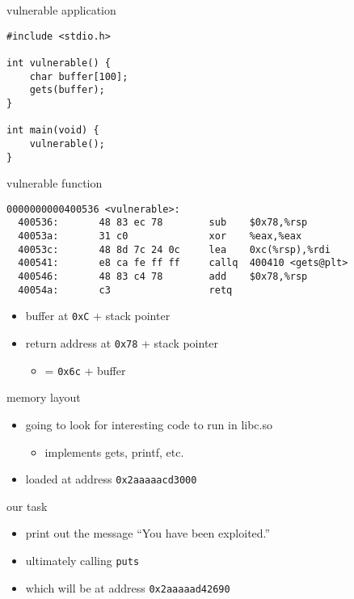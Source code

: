 \begin{frame}[fragile,label=vuln]{vulnerable application}
    \lstset{language=C,style=small}
\begin{lstlisting}
#include <stdio.h>

int vulnerable() {
    char buffer[100];
    gets(buffer);
}

int main(void) {
    vulnerable();
}
\end{lstlisting}
\end{frame}

\begin{frame}[fragile,label=vulnFunc]{vulnerable function}
    \lstset{language=myasm,style=small}
\begin{lstlisting}
0000000000400536 <vulnerable>:
  400536:       48 83 ec 78        sub    $0x78,%rsp
  40053a:       31 c0              xor    %eax,%eax
  40053c:       48 8d 7c 24 0c     lea    0xc(%rsp),%rdi
  400541:       e8 ca fe ff ff     callq  400410 <gets@plt>
  400546:       48 83 c4 78        add    $0x78,%rsp
  40054a:       c3                 retq   
\end{lstlisting}
    \begin{itemize}
        \item<2> buffer at \texttt{0xC} + stack pointer
        \item<2> return address at \texttt{0x78} + stack pointer
            \begin{itemize}
                \item = \texttt{0x6c} + buffer
            \end{itemize}
    \end{itemize}
\end{frame}

\begin{frame}[fragile,label=memoryLayout]{memory layout}
\begin{itemize}
    \item going to look for interesting code to run in libc.so
        \begin{itemize}
        \item implements gets, printf, etc.
        \end{itemize}
    \item loaded at address {\tt 0x2aaaaacd3000}
\end{itemize}
\end{frame}

\begin{frame}{our task}
    \begin{itemize}
    \item print out the message ``You have been exploited.''
    \item ultimately calling {\tt puts}
    \item which will be at address {\tt 0x2aaaaad42690}
    \end{itemize}
\end{frame}

